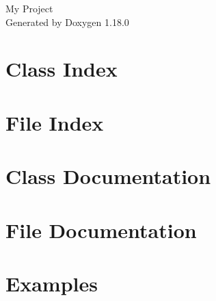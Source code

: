 \documentclass[twoside]{book}
\newcommand{\+}{\discretionary{\mbox{\scriptsize$\hookleftarrow$}}{}{}}
\newcommand{\clearemptydoublepage}{%
    \newpage{\pagestyle{empty}\cleardoublepage}%
  }
\begin{document}
  \raggedbottom
    \hypersetup{pageanchor=false,
                bookmarksnumbered=true,
                pdfencoding=unicode
               }
  \begin{titlepage}
  \vspace*{7cm}
  \begin{center}%
  {\Large My Project}\\
  \vspace*{1cm}
  {\large Generated by Doxygen 1.18.0}\\
  \end{center}
  \end{titlepage}
  \clearemptydoublepage
  \tableofcontents
  \clearemptydoublepage
  \hypersetup{pageanchor=true}
\chapter{Class Index}

\chapter{File Index}

\chapter{Class Documentation}



\chapter{File Documentation}



















\chapter{Examples}

  \backmatter
  \newpage
  \clearemptydoublepage
  \printindex
\end{document}
